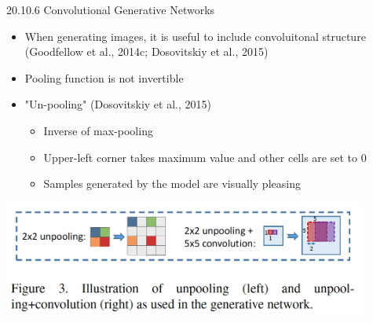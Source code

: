 \documentclass[dvipdfmx,presentation]{beamer}
\begin{document}
\begin{frame}[label={sec:orgheadline37}]{20.10.6 Convolutional Generative Networks}
\begin{itemize}
\item When generating images, it is useful to include convoluitonal structure (Goodfellow et al., 2014c; Dosovitskiy et al., 2015)
\item Pooling function is not invertible
\item "Un-pooling" (Dosovitskiy et al., 2015) 
\begin{itemize}
\item Inverse of max-pooling
\item Upper-left corner takes maximum value and other cells are set to 0
\item Samples generated by the model are visually pleasing
\end{itemize}
\end{itemize}

\centering
\includegraphics[width=0.9\textwidth]{./figure/dosovitskiy2014fig3.png}
\end{frame}
\end{document}
